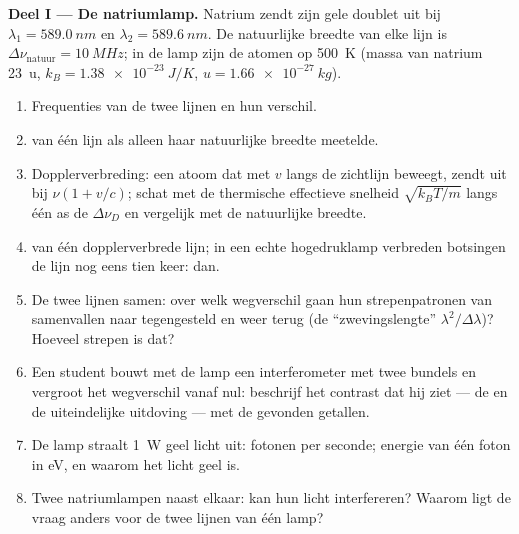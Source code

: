 \begin{problem}
\label{pb:b2:scalar-light-model:1}

\medskip
\noindent\textbf{Deel I --- De natriumlamp.}
Natrium zendt zijn gele doublet uit bij $\lambda_1 = \qty{589.0}{nm}$ en
$\lambda_2 =
\qty{589.6}{nm}$. De natuurlijke breedte van elke lijn is
$\Delta\nu_{\text{natuur}} =
\qty{10}{MHz}$; in de lamp zijn de atomen op
\qty{500}{K} (massa van natrium \qty{23}{u}, $k_B = \qty{1.38e-23}{J/K}$,
$u = \qty{1.66e-27}{kg}$).
\begin{enumerate}
  \item Frequenties van de twee lijnen en hun verschil.
  \item {} van één lijn als alleen haar natuurlijke breedte meetelde.
  \item Dopplerverbreding: een atoom dat met $v$ langs de zichtlijn beweegt,
        zendt uit bij $\nu(1 + v/c)$; schat met de thermische effectieve
        snelheid $\sqrt{k_BT
        /m}$ langs één as de $\Delta\nu_D$ en vergelijk
        met de natuurlijke breedte.
  \item {} van één dopplerverbrede lijn; in een echte
        hogedruklamp verbreden botsingen de lijn nog eens tien keer:
         dan.
  \item De twee lijnen samen: over welk wegverschil gaan hun strepenpatronen
        van samenvallen naar tegengesteld en weer terug (de
        ``zwevingslengte'' $\lambda^2/\Delta\lambda$)? Hoeveel strepen is
        dat?
  \item Een student bouwt met de lamp een interferometer met twee bundels en
        vergroot het wegverschil vanaf nul: beschrijf het contrast dat hij
        ziet --- de  en de uiteindelijke uitdoving --- met de
        gevonden getallen.
  \item De lamp straalt \qty{1}{W} geel licht uit: fotonen per seconde;
        energie van één foton in eV, en waarom het licht geel is.
  \item Twee natriumlampen naast elkaar: kan hun licht interfereren? Waarom
        ligt de vraag anders voor de twee lijnen van één lamp?
\end{enumerate}


\end{problem}
